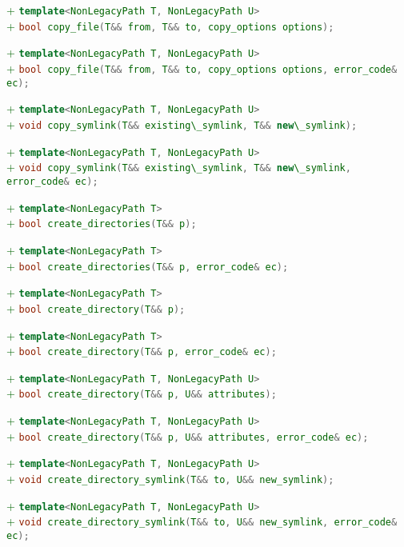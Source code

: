 \documentclass[11pt]{article}
\newcommand{\code}[2][cpp]{\lstinline[language=#1,basicstyle=\small\ttfamily]{#2}}
\newcommand{\tsreplace}[3]{\textcolor{red}{\sout{#1}}#2\textcolor{darkgreen}{#3}}
\begin{document}
\tsreplace{}{}{+ \code{template<NonLegacyPath T, NonLegacyPath U>}}\\
\tsreplace{}{}{+ \code{bool copy_file(T&& from, T&& to, copy_options options);}}

\tsreplace{}{}{+ \code{template<NonLegacyPath T, NonLegacyPath U>}}\\
\tsreplace{}{}{+ \code{bool copy_file(T&& from, T&& to, copy_options options, error_code& ec);}}

\tsreplace{}{}{+ \code{template<NonLegacyPath T, NonLegacyPath U>}}\\
\tsreplace{}{}{+ \code{void copy_symlink(T&& existing\_symlink, T&& new\_symlink);}}

\tsreplace{}{}{+ \code{template<NonLegacyPath T, NonLegacyPath U>}}\\
\tsreplace{}{}{+ \code{void copy_symlink(T&& existing\_symlink, T&& new\_symlink, error_code& ec);}}

\tsreplace{}{}{+ \code{template<NonLegacyPath T>}}\\
\tsreplace{}{}{+ \code{bool create_directories(T&& p);}}

\tsreplace{}{}{+ \code{template<NonLegacyPath T>}}\\
\tsreplace{}{}{+ \code{bool create_directories(T&& p, error_code& ec);}}

\tsreplace{}{}{+ \code{template<NonLegacyPath T>}}\\
\tsreplace{}{}{+ \code{bool create_directory(T&& p);}}

\tsreplace{}{}{+ \code{template<NonLegacyPath T>}}\\
\tsreplace{}{}{+ \code{bool create_directory(T&& p, error_code& ec);}}

\tsreplace{}{}{+ \code{template<NonLegacyPath T, NonLegacyPath U>}}\\
\tsreplace{}{}{+ \code{bool create_directory(T&& p, U&& attributes);}}

\tsreplace{}{}{+ \code{template<NonLegacyPath T, NonLegacyPath U>}}\\
\tsreplace{}{}{+ \code{bool create_directory(T&& p, U&& attributes, error_code& ec);}}

\tsreplace{}{}{+ \code{template<NonLegacyPath T, NonLegacyPath U>}}\\
\tsreplace{}{}{+ \code{void create_directory_symlink(T&& to, U&& new_symlink);}}

\tsreplace{}{}{+ \code{template<NonLegacyPath T, NonLegacyPath U>}}\\
\tsreplace{}{}{+ \code{void create_directory_symlink(T&& to, U&& new_symlink, error_code& ec);}}
\end{document}

